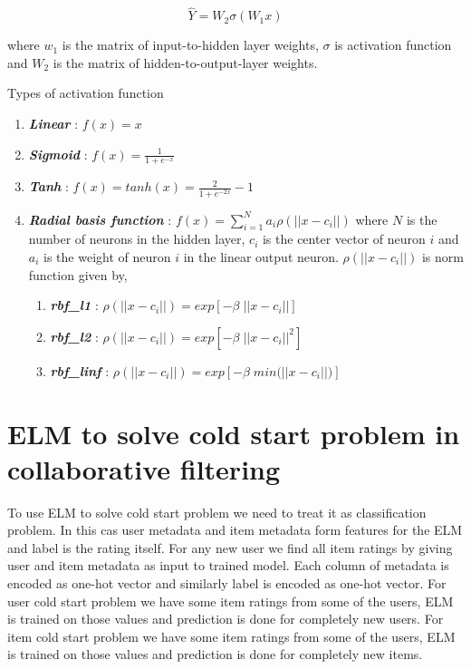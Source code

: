 \documentclass[paper=a4, fontsize=11pt]{scrartcl} %
\numberwithin{equation}{section} %
\numberwithin{figure}{section} %
\numberwithin{table}{section} %
\begin{document}
\begin{equation}
   \hat{Y} = W_2 \sigma (W_1x)
\end{equation}

where $w_1$ is the matrix of input-to-hidden layer weights, $\sigma$ is activation function and $W_2$ is the matrix of hidden-to-output-layer weights.

Types of activation function

\begin{enumerate}
    \item \textit{\textbf{Linear}} : $f(x) = x$
    \item \textit{\textbf{Sigmoid}} : $f(x) = \frac{1}{1+e^{-x}}$
    \item \textit{\textbf{Tanh}} : $f(x) = tanh(x) = \frac{2}{1+e^{-2x}} - 1$
    \item \textit{\textbf{Radial basis function}} : $f(x) = \sum_{i=1}^{N} a_i \rho(||x-c_i||)$ 
            where $N$ is the number of neurons in the hidden layer, $c_i$ is the center vector of neuron $i$ and $a_i$ is the weight of neuron $i$ in the linear output neuron. $\rho(||x-c_i||)$ is norm function given by,

            \begin{enumerate}
                \item \textit{\textbf{rbf\_l1}} : $\rho(||x-c_i||) = exp[-\beta \; ||x-c_i||]$
                \item \textit{\textbf{rbf\_l2}} : $\rho(||x-c_i||) = exp[{-\beta \; ||x-c_i||}^{2}]$
                \item \textit{\textbf{rbf\_linf}} : $\rho(||x-c_i||) = exp[{-\beta \; min(||x-c_i||})]$
            \end{enumerate}
\end{enumerate}


\section{ELM to solve cold start problem in collaborative filtering}

\par
To use ELM to solve cold start problem we need to treat it as classification problem. In this cas user metadata and item metadata form features for the ELM and label is the rating itself. For any new user we find all item ratings by giving user and item metadata as input to trained model. Each column of metadata is encoded as one-hot vector and similarly label is encoded as one-hot vector. For user cold start problem we have some item ratings from some of the users, ELM is trained on those values and prediction is done for completely new users. For item cold start problem we have some item ratings from some of the users, ELM is trained on those values and prediction is done for completely new items.
\end{document}
